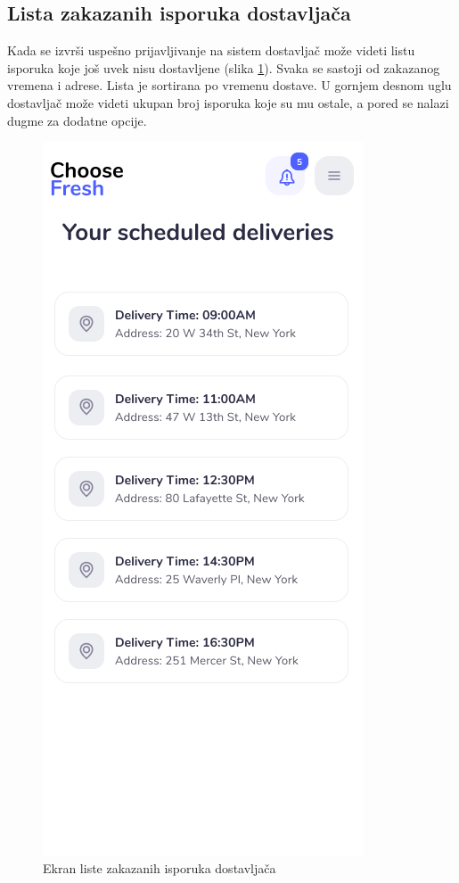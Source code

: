 \subsection{Lista zakazanih isporuka dostavljača}

Kada se izvrši uspešno prijavljivanje na sistem dostavljač može videti listu isporuka koje još uvek nisu dostavljene (slika \ref{fig:DeliverymanList}). Svaka se sastoji od zakazanog vremena i adrese. Lista je sortirana po vremenu dostave. U gornjem desnom uglu dostavljač može videti ukupan broj isporuka koje su mu ostale, a pored se nalazi dugme za dodatne opcije. 


\begin{figure}[H]
	\begin{center}
		\includegraphics[scale=0.3]{UI/deliveryman_list_of_packages.png}
    		\caption{Ekran liste zakazanih isporuka dostavljača}
    \label{fig:DeliverymanList}
    \end{center}
\end{figure}